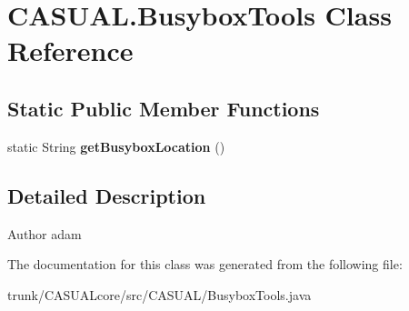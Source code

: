 \hypertarget{classCASUAL_1_1BusyboxTools}{\section{C\-A\-S\-U\-A\-L.\-Busybox\-Tools Class Reference}
\label{classCASUAL_1_1BusyboxTools}
}
\subsection*{Static Public Member Functions}
\begin{DoxyCompactItemize}
\item 
\hypertarget{classCASUAL_1_1BusyboxTools_a9d1f19f03f097eb5d2617f6425fd02fb}{static String {\bfseries get\-Busybox\-Location} ()}\label{classCASUAL_1_1BusyboxTools_a9d1f19f03f097eb5d2617f6425fd02fb}

\end{DoxyCompactItemize}


\subsection{Detailed Description}
\begin{DoxyAuthor}{Author}
adam 
\end{DoxyAuthor}


The documentation for this class was generated from the following file\-:\begin{DoxyCompactItemize}
\item 
trunk/\-C\-A\-S\-U\-A\-Lcore/src/\-C\-A\-S\-U\-A\-L/Busybox\-Tools.\-java\end{DoxyCompactItemize}
